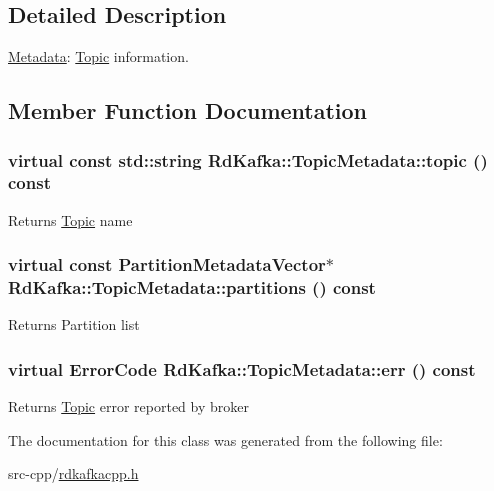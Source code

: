 \subsection{Detailed Description}
\hyperlink{classRdKafka_1_1Metadata}{Metadata}: \hyperlink{classRdKafka_1_1Topic}{Topic} information. 

\subsection{Member Function Documentation}
\hypertarget{classRdKafka_1_1TopicMetadata_ac344fa7442c91d89a7d80a39816d9d9f}{
\subsubsection[{topic}]{\setlength{\rightskip}{0pt plus 5cm}virtual const std::string RdKafka::TopicMetadata::topic () const}}
\label{classRdKafka_1_1TopicMetadata_ac344fa7442c91d89a7d80a39816d9d9f}
\begin{DoxyReturn}{Returns}
\hyperlink{classRdKafka_1_1Topic}{Topic} name 
\end{DoxyReturn}
\hypertarget{classRdKafka_1_1TopicMetadata_a12ab2dc3e052e307a749c90d467c211b}{
\subsubsection[{partitions}]{\setlength{\rightskip}{0pt plus 5cm}virtual const {\bf PartitionMetadataVector}$\ast$ RdKafka::TopicMetadata::partitions () const}}
\label{classRdKafka_1_1TopicMetadata_a12ab2dc3e052e307a749c90d467c211b}
\begin{DoxyReturn}{Returns}
Partition list 
\end{DoxyReturn}
\hypertarget{classRdKafka_1_1TopicMetadata_a01748dcf03bb40267856600a3221c4e0}{
\subsubsection[{err}]{\setlength{\rightskip}{0pt plus 5cm}virtual ErrorCode RdKafka::TopicMetadata::err () const}}
\label{classRdKafka_1_1TopicMetadata_a01748dcf03bb40267856600a3221c4e0}
\begin{DoxyReturn}{Returns}
\hyperlink{classRdKafka_1_1Topic}{Topic} error reported by broker 
\end{DoxyReturn}


The documentation for this class was generated from the following file:\begin{DoxyCompactItemize}
\item 
src-\/cpp/\hyperlink{rdkafkacpp_8h}{rdkafkacpp.h}\end{DoxyCompactItemize}
